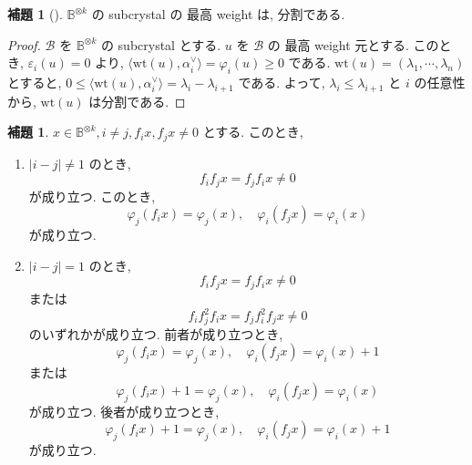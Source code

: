 \documentclass[
  a4paper, 
  12pt,
  ja=standard,
  xelatex,
  left=30truemm,
  right=30truemm,
  titlepage 
]{bxjsarticle}
\theoremstyle{definition}
\newtheorem{lem}[thm]{補題}
\begin{document}
\begin{lem}[{\cite[命題2.16]{b2}}] \label{higest-weight-is-partation}
  $\mathbb{B}^{ \otimes k}$ の subcrystal の 最高 weight は,
  分割である.
\end{lem}

\begin{proof}
  $\mathcal{B}$ を $\mathbb{B}^{ \otimes k}$ の subcrystal とする.
  $u$ を $\mathcal{B}$ の 最高 weight 元とする.
  このとき, $\varepsilon_i(u) = 0$ より,
  $\langle \mathrm{wt}(u), \alpha_i^{ \vee } \rangle = \varphi_i(u) \geq 0$ である.
  $\mathrm{wt}(u) = (\lambda_1, \cdots, \lambda_n )$ とすると,
  $ 0 \leq \langle \mathrm{wt}(u), \alpha_i^{ \vee } \rangle = \lambda_i - \lambda_{ i + 1}$
  である. よって, $\lambda_i \leq \lambda_{ i + 1 }$ と $i$ の任意性から, $\mathrm{wt}(u)$
  は分割である.
\end{proof}

\begin{lem}{\cite[定理4.11]{b2}}
  $x \in \mathbb{B}^{ \otimes k} , i \neq j, f_i x, f_j x \neq 0$ とする. このとき,
  \begin{enumerate}
    \item
    $| i - j | \neq 1$ のとき, 
    $$f_if_j x =f_jf_i x \neq 0$$
    が成り立つ.
    このとき,
    $$\varphi_j(f_ix) = \varphi_j(x), \quad \varphi_i(f_jx) = \varphi_i(x)$$
    が成り立つ.
    \item
    $| i - j | = 1$ のとき,
    $$f_if_j x = f_jf_i x \neq 0$$ 
    または
    $$f_if_j^2f_i x = f_jf_i^2f_j x \neq 0$$
    のいずれかが成り立つ.
    前者が成り立つとき,
    $$\varphi_j(f_ix) = \varphi_j(x), \quad \varphi_i(f_jx) = \varphi_i(x) + 1$$
    または
    $$\varphi_j(f_ix) + 1 = \varphi_j(x), \quad \varphi_i(f_jx) = \varphi_i(x)$$
    が成り立つ.
    後者が成り立つとき,
    $$\varphi_j(f_ix) + 1 = \varphi_j(x), \quad \varphi_i(f_jx) = \varphi_i(x) + 1$$
    が成り立つ.
  \end{enumerate}
\end{lem}
\end{document}

